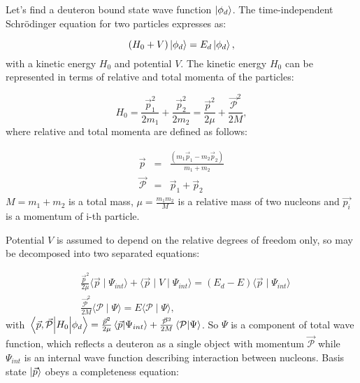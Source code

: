     Let's find a deuteron bound state wave function $\ket{\phi_d}$. 
    The time-independent Schr\"{o}dinger
    equation for two particles expresses as:

    \begin{equation}
        (H_0 + V) \ket{\phi_d}  = E_d \ket{\phi_d},
        \label{shrod_bound}
    \end{equation}
    with a kinetic energy $H_0$ and potential $V$. 
    The kinetic energy $H_0$ can be represented in terms of  relative and total momenta
    of the particles:

    \begin{equation}
        H_0 = \frac{\vec{p}_1^2}{2m_1} + \frac{\vec{p}_2^2}{2m_2} = 
        \frac{\vec{p}^2}{2\mu} + \frac{\vec{\mathcal{P}}^2}{2M}, 
    \end{equation}
    where relative and total momenta are defined as follows:

    \begin{eqnarray}
        \vec{p} &=& \frac{(m_1\vec{p}_1 - m_2\vec{p}_2)}{m_1 + m_2}\\
        \vec{\mathcal{P}} &=& \vec{p}_1 + \vec{p}_2
    \end{eqnarray}
    $M = m_1 + m_2$ is a total mass, $\mu = \frac{m_1m_2}{M}$ is a relative mass of two nucleons and 
    $\vec{p_i}$ is a momentum of i-th particle.

    Potential $V$ is assumed to depend on the relative degrees of freedom only, so
     may be decomposed into two separated equations:

    \begin{eqnarray}
        &\frac{\vec{p}^2}{2\mu} \langle \vec{p} \mid \Psi_{int} \rangle +
        \langle \vec{p} \mid V \mid \Psi_{int} \rangle = 
        (E_d - E)\langle \vec{p} \mid \Psi_{int} \rangle \label{se1}\\
        &\frac{\vec{\mathcal{P}}^2}{2M} \langle \mathcal{P} \mid \Psi \rangle = 
        E\langle \mathcal{P} \mid \Psi \rangle \label{se2},
    \end{eqnarray}
    with $\matrixel{\vec{p},\vec{\mathcal{P}}}{H_0}{\phi_d} = \frac{\vec{p}^2}{2\mu} \braket{\vec{p}}{\Psi_{int}} +
    \frac{\vec{\mathcal{P}}^2}{2M} \braket {\mathcal{P}} {\Psi} $. So $\Psi$ is a component 
    of total wave function, which reflects a deuteron as a single object with momentum $\vec{\mathcal{P}}$
    while $\Psi_{int}$ is an internal wave function describing interaction between nucleons.
    Basis state $\ket{\vec{p}}$  obeys a completeness
    equation:

